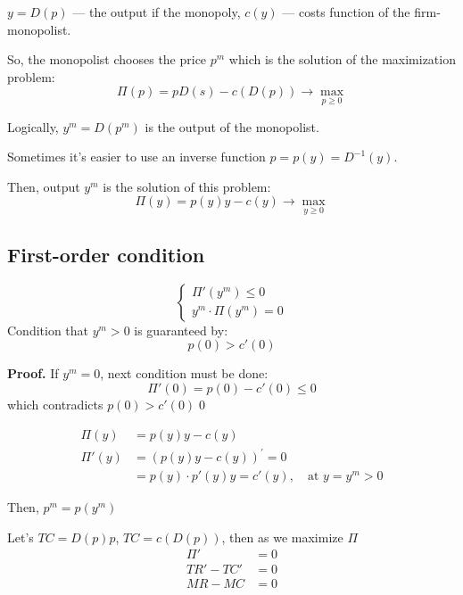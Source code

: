 \documentclass[a4paper, 10pt]{article}
\begin{document}
$y=D(p)$ — the output if the monopoly, $c(y)$ — costs function of the firm-monopolist.

So, the monopolist chooses the price $p^m$ which is the solution of the maximization problem:
\begin{equation}\label{eq:1.3.1}
    \Pi(p)=pD(s)-c(D(p))\longrightarrow\max_{p\geqslant0}
\end{equation}

Logically, $y^m=D(p^m)$ is the output of the monopolist.

Sometimes it's easier to use an inverse function $p=p(y)=D^{-1}(y)$.

Then, output $y^m$ is the solution of this problem:
\begin{equation}\label{eq:1.3.2}
    \Pi(y)=p(y)y-c(y)\longrightarrow\max_{y\geqslant0}
\end{equation}

\subsection{First-order condition}
\begin{equation}
    \begin{cases}
        \Pi'(y^m)\leqslant 0\\
        y^m\cdot\Pi(y^m)=0
    \end{cases}
\end{equation}
\indent Condition that $y^m>0$ is guaranteed by:
\begin{equation}
    p(0)>c'(0)
\end{equation}

\textbf{Proof.} If $y^m=0$, next condition must be done:
\begin{equation*}
    \Pi'(0)=p(0)-c'(0)\leqslant 0
\end{equation*}
which contradicts $p(0)>c'(0)$\qed

\begin{equation}
    \begin{aligned}
        \Pi(y)&=p(y)y-c(y)\\
        \Pi'(y)&=\left(p(y)y-c(y)\right)^{\prime}=0\\
        &=p(y)\cdot p'(y)y=c'(y),\quad \text{at }y=y^m>0
    \end{aligned}
\end{equation}

Then, $p^m=p(y^m)$

Let's $TC=D(p)p$, $TC=c(D(p))$, then as we maximize $\Pi$
\begin{equation*}
    \begin{aligned}
        \Pi'&=0\\
        TR'-TC'&=0\\
        MR-MC&=0
    \end{aligned}
\end{equation*}
\end{document}
